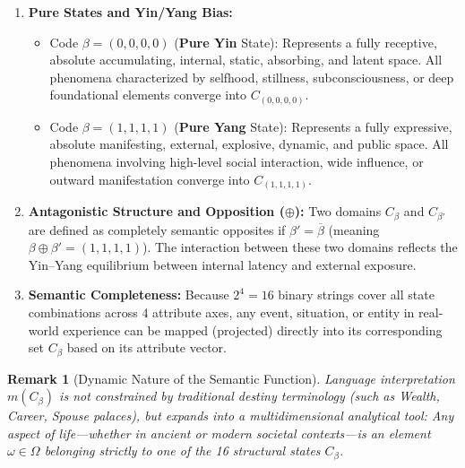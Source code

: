 \documentclass[a4paper,14pt, twoside]{memoir}
\newtheorem{remark}{Remark}
\begin{document}
\begin{enumerate}[label=\arabic*.]
	\item \textbf{Pure States and Yin/Yang Bias:}
	      \begin{itemize}
		      \item Code $\beta = (0,0,0,0)$ (\textbf{Pure Yin} State): Represents a fully receptive, absolute accumulating, internal, static, absorbing, and latent space. All phenomena characterized by selfhood, stillness, subconsciousness, or deep foundational elements converge into $C_{(0,0,0,0)}$.
		      \item Code $\beta = (1,1,1,1)$ (\textbf{Pure Yang} State): Represents a fully expressive, absolute manifesting, external, explosive, dynamic, and public space. All phenomena involving high-level social interaction, wide influence, or outward manifestation converge into $C_{(1,1,1,1)}$.
	      \end{itemize}

	\item \textbf{Antagonistic Structure and Opposition ($\oplus$):}
	      Two domains $C_\beta$ and $C_{\beta'}$ are defined as completely semantic opposites if $\beta' = \overline{\beta}$ (meaning $\beta \oplus \beta' = (1,1,1,1)$). The interaction between these two domains reflects the Yin--Yang equilibrium between internal latency and external exposure.

	\item \textbf{Semantic Completeness:}
	      Because $2^4 = 16$ binary strings cover all state combinations across 4 attribute axes, any event, situation, or entity in real-world experience can be mapped (projected) directly into its corresponding set $C_\beta$ based on its attribute vector.
\end{enumerate}

\begin{remark}[Dynamic Nature of the Semantic Function]
	Language interpretation $m(C_\beta)$ is not constrained by traditional destiny terminology (such as Wealth, Career, Spouse palaces), but expands into a multidimensional analytical tool: Any aspect of life—whether in ancient or modern societal contexts—is an element $\omega \in \Omega$ belonging strictly to one of the 16 structural states $C_\beta$.
\end{remark}
\end{document}
